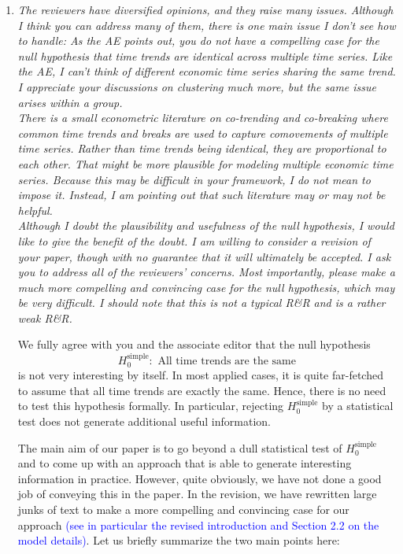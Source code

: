 \documentclass[a4paper,12pt]{article}
\begin{document}
\begin{enumerate}[label=\arabic*.,leftmargin=0.6cm]


\item \textit{The reviewers have diversified opinions, and they raise many issues. Although I think you can address many of them, there is one main issue I don’t see how to handle: As the AE points out, you do not have a compelling case for the null hypothesis that time trends are identical across multiple time series. Like the AE, I can’t think of different economic time series sharing the same trend.  I appreciate your discussions on clustering much more, but the same issue arises within a group. \\
There is a small econometric literature on co-trending and co-breaking where common time trends and breaks are used to capture comovements of multiple time series. Rather than time trends being identical, they are proportional to each other. That might be more plausible for modeling multiple economic time series. Because this may be difficult in your framework, I do not mean to impose it.  Instead, I am pointing out that such literature may or may not be helpful. \\
Although I doubt the plausibility and usefulness of the null hypothesis, I would like to give the benefit of the doubt. I am willing to consider a revision of your paper, though with no guarantee that it will ultimately be accepted. I ask you to address all of the reviewers' concerns. Most importantly, please make a much more compelling and convincing case for the null hypothesis, which may be very difficult. I should note that this is not a typical R\&R and is a rather weak R\&R.
}

We fully agree with you and the associate editor that the null hypothesis
\[ H_0^{\text{simple}}: \text{ All time trends are the same} \]
is not very interesting by itself. In most applied cases, it is quite far-fetched to assume that all time trends are exactly the same. Hence, there is no need to test this hypothesis formally. In particular, rejecting $H_0^{\text{simple}}$ by a statistical test does not generate additional useful information.

The main aim of our paper is to go beyond a dull statistical test of $H_0^{\text{simple}}$ and to come up with an approach that is able to generate interesting information in practice. However, quite obviously, we have not done a good job of conveying this in the paper. In the revision, we have rewritten large junks of text to make a more compelling and convincing case for our approach \textcolor{blue}{(see in particular the revised introduction and Section 2.2 on the model details)}. Let us briefly summarize the two main points here: 
\begin{enumerate}[leftmargin=0.7cm]


\end{enumerate}
\end{enumerate}
\end{document}

